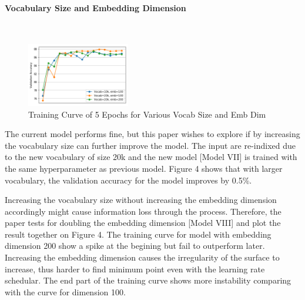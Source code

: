 \documentclass[10pt]{article}
\begin{document}
\paragraph{Vocabulary Size and Embedding Dimension}
\begin{figure} \

   \includegraphics[width=0.4\textwidth,right]{plot4}
   \caption{Training Curve of 5 Epochs for Various Vocab Size and Emb Dim}

\end{figure} 
The current model performs fine, but this paper wishes to explore if by increasing the vocabulary size can further improve the model. The input are re-indixed due to the new vocabulary of size 20k and the new model [Model VII] is trained with the same hyperparameter as previous model. Figure 4 shows that with larger vocabulary, the validation accuracy for the model improves by 0.5\%. \par
Increasing the vocabulary size without increasing the embedding dimension accordingly might cause information loss through the process. Therefore, the paper tests for doubling the embedding dimension [Model VIII] and plot the result together on Figure 4. The training curve for model with embedding dimension 200 show a spike at the begining but fail to outperform later. Increasing the embedding dimension causes the irregularity of the surface to increase, thus harder to find minimum point even with the learning rate schedular. The end part of the training curve shows more instability comparing with the curve for dimension 100.
\end{document}
